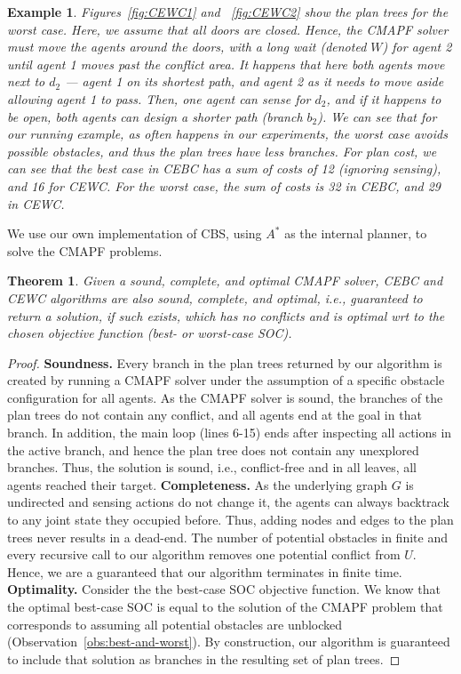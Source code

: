 \documentclass[letterpaper]{article} %
\newtheorem{exmp}{Example}
\newtheorem{theorem}{Theorem}
\begin{document}
\begin{exmp}
Figures~\ref{fig:CEWC1} and ~\ref{fig:CEWC2} show the plan trees for the worst case. Here, we assume that all doors are closed. Hence, the CMAPF solver must move the agents around the doors, with a long wait (denoted $W$) for agent 2 until agent 1 moves past the conflict area. It happens that here both agents move next to $d_2$ --- agent 1 on its shortest path, and agent 2 as it needs to move aside allowing agent 1 to pass. Then, one agent can sense for $d_2$, and if it happens to be open, both agents can design a shorter path (branch $b_2$).
We can see that for our running example, as often happens in our experiments, the worst case avoids possible obstacles, and thus the plan trees have less branches. For plan cost, we can see that the best case in CEBC has a sum of costs of 12 (ignoring sensing), and 16 for CEWC. For the worst case, the sum of costs is 32 in CEBC, and 29 in CEWC.
\end{exmp}
We use our own implementation of CBS, using $A^*$ as the internal planner, to solve the CMAPF problems.
\begin{theorem}
Given a sound, complete, and optimal CMAPF solver, CEBC and CEWC algorithms are also sound, complete, and optimal, i.e., guaranteed to return a solution, if such exists, which has no conflicts and is optimal wrt to the chosen objective function (best- or worst-case SOC).
\end{theorem}
\begin{proof}
\noindent \textbf{Soundness.}
Every branch in the plan trees returned by our algorithm is created by running a CMAPF solver under the assumption of a specific obstacle configuration for all agents.
As the CMAPF solver is sound, the branches of the plan trees do not contain any conflict, and all agents end at the goal in that branch. In addition, the main loop (lines 6-15) ends after inspecting all actions in the active branch, and hence the plan tree does not contain any unexplored branches.
Thus, the solution is sound, i.e., conflict-free and in all leaves, all agents reached their target.
\noindent\textbf{Completeness.}
As the underlying graph $G$ is undirected and sensing actions do not change it, the agents can always backtrack to any joint state they occupied before. Thus, adding nodes and edges to the plan trees never results in a dead-end.
The number of potential obstacles in finite and every recursive call to our algorithm removes one potential conflict from $U$. Hence, we are a guaranteed that our algorithm terminates in finite time.
\noindent\textbf{Optimality.} Consider the the best-case SOC objective function. We know that the optimal best-case SOC is equal to the solution of the CMAPF problem that corresponds to assuming all potential obstacles are unblocked (Observation~\ref{obs:best-and-worst}). By construction, our algorithm is guaranteed to include that solution as branches in the resulting set of plan trees.
\end{proof}
\end{document}

